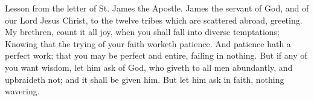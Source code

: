 Lesson from the letter of St. James the Apostle.
James the servant of God, and of our Lord Jesus Christ, to the twelve tribes which are scattered abroad, greeting.
My brethren, count it all joy, when you shall fall into diverse temptations;
Knowing that the trying of your faith worketh patience.
And patience hath a perfect work; that you may be perfect and entire, failing in nothing.
But if any of you want wisdom, let him ask of God, who giveth to all men abundantly, and upbraideth not; and it shall be given him.
But let him ask in faith, nothing wavering.
